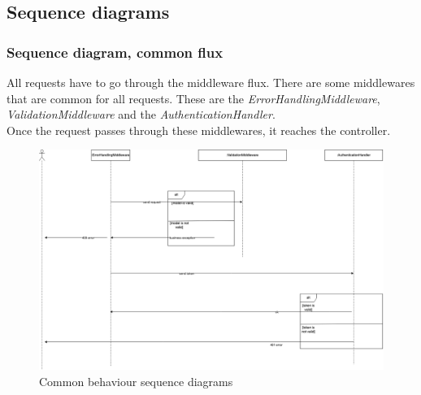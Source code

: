     \subsection{Sequence diagrams}
        \subsubsection{Sequence diagram, common flux}
            All requests have to go through the middleware flux. There are some middlewares that are common for all requests. These are the \textit{ErrorHandlingMiddleware}, \textit{ValidationMiddleware} and the \textit{AuthenticationHandler}. \\
            Once the request passes through these middlewares, it reaches the controller.
                \begin{figure}[H]
                    \centering
                        \includegraphics[width=\textwidth]{assets/diagrams/sequence_common.png}
                    \caption{Common behaviour sequence diagrams}
                    \label{fig:implementation_common}
                \end{figure}

